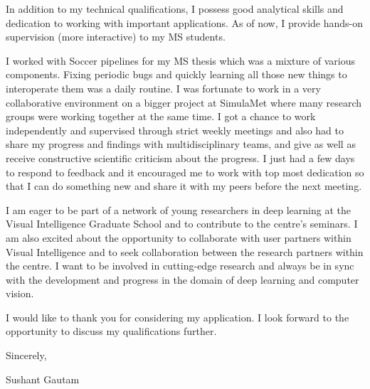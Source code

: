 In addition to my technical qualifications, I possess good analytical skills and dedication to working with important applications. As of now, I provide hands-on supervision (more interactive) to my MS students. 

I worked with Soccer pipelines for my MS thesis which was a mixture of various components. Fixing periodic bugs and quickly learning all those new things to inter\-operate them was a daily routine.
 I was fortunate to work in a very collaborative environment on a bigger project at SimulaMet where many research groups were working together at the same time. I got a chance to work independently and supervised through strict weekly meetings and also had to  share my progress and findings with multidisciplinary teams, and give as well as receive constructive scientific criticism about the progress. I just had a few days to respond to feedback and it encouraged me to work with top most dedication so that I can do something new and share it with my peers before the next meeting. 



I am eager to be part of a network of young researchers in deep learning at the Visual Intelligence Graduate School and to contribute to the centre's seminars. I am also excited about the opportunity to collaborate with user partners within Visual Intelligence and to seek collaboration between the research partners within the centre.  I want to be involved in cutting-edge research and always be in sync with the development and progress in the domain of deep learning and computer vision.

I would like to thank you for considering my application. I look forward to the opportunity to discuss my qualifications further.

Sincerely,

Sushant Gautam
